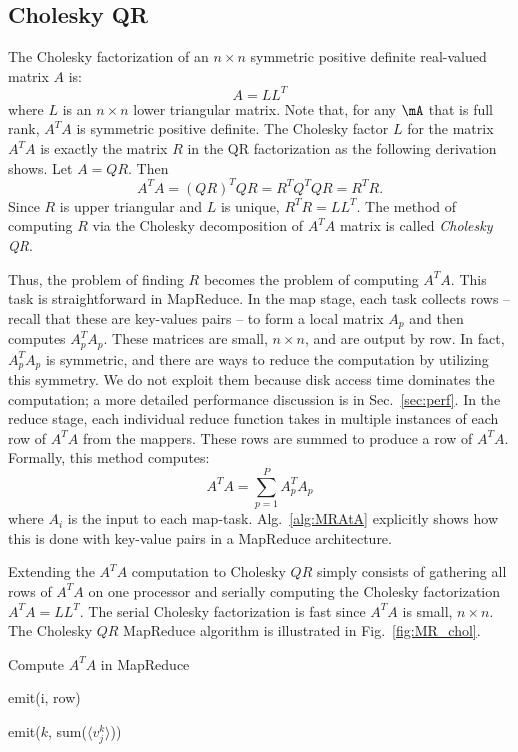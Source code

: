 \documentclass[10pt, conference, compsocconf]{IEEEtran}
\begin{document}
\subsection{Cholesky QR}

The Cholesky factorization of an $n \times n$ symmetric positive definite real-valued matrix $A$ is: 
\[ A = LL^T \]
where $L$ is an $n \times n$ lower triangular matrix.  Note that, for any $\mA$ that is full rank, $A^TA$ is symmetric positive definite.  The Cholesky factor $L$ for the matrix $A^T A$ is exactly the matrix $R$ in the QR factorization as the following derivation shows.  Let $A = QR$.  Then
\[A^TA = (QR)^TQR = R^TQ^TQR = R^TR.\]
Since $R$ is upper triangular and $L$ is unique, $R^TR = LL^T$.  The method of computing $R$ via the Cholesky decomposition of $A^TA$ matrix is called \emph{Cholesky QR}.

Thus, the problem of finding $R$ becomes the problem of computing $A^T A$.  This task is straightforward in MapReduce.  In the map stage, each task collects rows -- recall that these are key-values pairs -- to form a local matrix $A_p$ and then computes $A_p^T A_p$.  These matrices are small, $n \times n$, and are output by row.  In fact, $A_p^T A_p$ is symmetric, and there are ways to reduce the computation by utilizing this symmetry. We do not exploit them because disk access time dominates the computation; a more detailed performance discussion is in Sec.~\ref{sec:perf}.
In the reduce stage, each individual reduce function takes in multiple instances of each row of $A^T A$ from the mappers.  These rows are summed to produce a row of $A^T A$.  Formally, this method computes: 
\[ A^T A = \sum_{p=1}^{P} A_p^T A_p \]
where $A_i$ is the input to each map-task.
Alg.~\ref{alg:MRAtA} explicitly shows how this is done with key-value pairs in a MapReduce architecture.

Extending the $A^TA$ computation to Cholesky $QR$ simply consists of gathering all rows of $A^TA$ on one processor and serially computing the Cholesky factorization $A^TA = LL^T$.  The serial Cholesky factorization is fast since $A^TA$ is small, $n \times n$.  The Cholesky $QR$ MapReduce algorithm is illustrated in Fig.~\ref{fig:MR_chol}.

\begin{algorithm}
  \caption{Compute $A^TA$ in MapReduce}
  \label{alg:MRAtA}
  \begin{algorithmic}
     \State emit(i, row)
    \EndFor
  \EndFunction

  \vspace{0.1in}

    \State emit($k$, sum($\langle v^{k}_j \rangle$))
  \EndFunction
  
  \end{algorithmic}
\end{algorithm}
\end{document}
